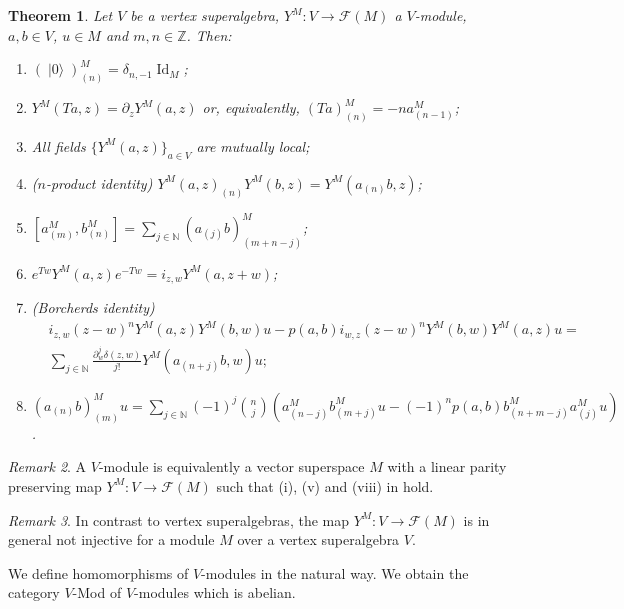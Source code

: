 \documentclass[a4paper, 12pt, reqno]{amsart}
\newtheorem{theorem}{Theorem}[section]
\theoremstyle{remark}
\newtheorem{remark}[theorem]{Remark}
\numberwithin{equation}{subsection}
\DeclareMathOperator{\Id}{Id}
\DeclareMathOperator{\vac}{|0\rangle}
\begin{document}
\begin{theorem}
  \label{thr:24}
  Let $V$ be a vertex superalgebra, $Y^M: V \to \mathcal{F}(M)$ a $V$-module, $a, b \in V$, $u \in M$ and $m, n \in \mathbb{Z}$.
  Then:
  \begin{enumerate}
  \item $(\vac)^M_{(n)} = \delta_{n, -1}\Id_M$;
  \item $Y^M(Ta, z) = \partial_zY^M(a, z)$ or, equivalently, $(Ta)^M_{(n)} = -na^M_{(n - 1)}$;
  \item All fields $\{Y^M(a, z)\}_{a \in V}$ are mutually local;
  \item \emph{($n$-product identity)} $Y^M(a, z)_{(n)}Y^M(b, z) = Y^M(a_{(n)}b, z)$;
  \item $[a^M_{(m)}, b^M_{(n)}] = \sum_{j \in \mathbb{N}}(a_{(j)}b)^M_{(m + n - j)}$;
  \item $e^{Tw}Y^M(a, z)e^{-Tw} = i_{z, w}Y^M(a, z + w)$;
  \item \emph{(Borcherds identity)}
    \begin{equation*}
      \begin{split}
        &i_{z, w}(z - w)^nY^M(a, z)Y^M(b, w)u - p(a, b)i_{w, z}(z - w)^nY^M(b, w)Y^M(a, z)u = \\
        &\sum_{j \in \mathbb{N}}\frac{\partial^j_w\delta(z, w)}{j!}Y^M(a_{(n + j)}b, w)u;
      \end{split}
    \end{equation*}
  \item $(a_{(n)}b)^M_{(m)}u = \sum_{j \in \mathbb{N}}(-1)^j\binom{n}{j}(a^M_{(n - j)}b^M_{(m + j)}u - (-1)^np(a, b)b^M_{(n + m - j)}a^M_{(j)}u)$.
  \end{enumerate}
\end{theorem}

\begin{remark}
  \label{rmk:21}
  A $V$-module is equivalently a vector superspace $M$ with a linear parity preserving map $Y^M: V \to \mathcal{F}(M)$ such that (i), (v) and (viii) in  hold.
\end{remark}

\begin{remark}
  \label{rmk:22}
  In contrast to vertex superalgebras, the map $Y^M: V \to \mathcal{F}(M)$ is in general not injective for a module $M$ over a vertex superalgebra $V$.
\end{remark}

We define homomorphisms of $V$-modules in the natural way.
We obtain the category $V$-Mod of $V$-modules which is abelian.
\end{document}
